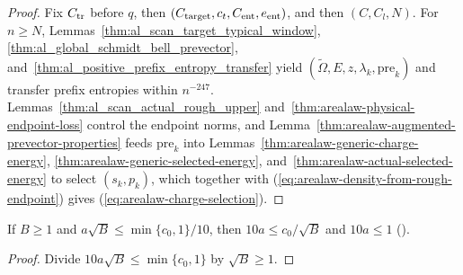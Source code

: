 \begin{proof}
    \leanok
    Fix $C_{\rm tr}$ before $q$, then $(C_{\rm target},c_t,C_{\rm ent},e_{\rm ent})$, and then $(C,C_l,N)$. For $n\ge N$, Lemmas~\ref{thm:al_scan_target_typical_window}, \ref{thm:al_global_schmidt_bell_prevector}, and~\ref{thm:al_positive_prefix_entropy_transfer} yield $(\widetilde\Omega,E,z,\lambda_k,\mathrm{pre}_k)$ and transfer prefix entropies within $n^{-247}$. Lemmas~\ref{thm:al_scan_actual_rough_upper} and~\ref{thm:arealaw-physical-endpoint-loss} control the endpoint norms, and Lemma~\ref{thm:arealaw-augmented-prevector-properties} feeds $\mathrm{pre}_k$ into Lemmas~\ref{thm:arealaw-generic-charge-energy}, \ref{thm:arealaw-generic-selected-energy}, and~\ref{thm:arealaw-actual-selected-energy} to select $(s_k,p_k)$, which together with (\ref{eq:arealaw-density-from-rough-endpoint}) gives (\ref{eq:arealaw-charge-selection}).
\end{proof}

\begin{lemma}
    \label{thm:arealaw-sharp-smallness}
    \leanok
    If $B\geq1$ and $a\sqrt B\leq\min\{c_0,1\}/10$, then
    $10a\leq c_0/\sqrt B$ and $10a\leq1$ (\cite[Proposition~9.2]{OpenAI2026AreaLaw}).
\end{lemma}
\begin{proof}
    \leanok
    Divide $10a\sqrt B\leq\min\{c_0,1\}$ by $\sqrt B\geq1$.
\end{proof}

